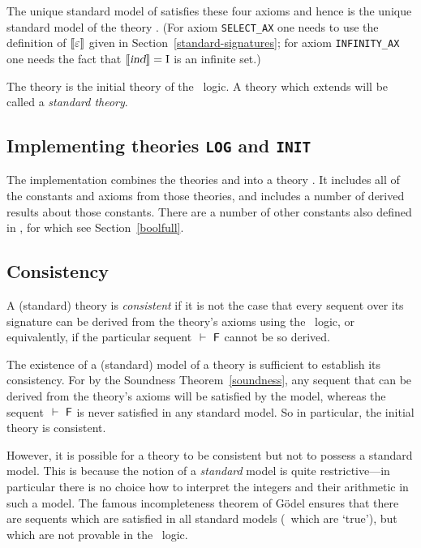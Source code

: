 The unique standard model of  satisfies these four axioms
and hence is the unique standard model of the theory
. (For axiom
{\small\tt SELECT\_AX} one needs to use the definition of
$[\![\varepsilon]\!]$ given in Section~\ref{standard-signatures}; for axiom
{\small\tt INFINITY\_AX} one needs the fact that $[\![\textsl{ind}]\!]=\mbox{\rm I}$ is
an infinite set.)

The theory  is the initial theory of the
\HOL\ logic. A theory which extends  will be called a
{\em standard theory}.

\subsection{Implementing theories \texttt{LOG} and \texttt{INIT}}
\label{sec:implementing-log-init}

The implementation combines the theories  and
 into a theory .  It includes all of the
constants and axioms from those theories, and includes a number of
derived results about those constants.  There are a number of other
constants also defined in , for which see
Section~\ref{boolfull}.

\subsection{Consistency}
\label{consistency}

A (standard) theory is {\em consistent\/} if
it is not the case that every sequent over its signature can be
derived from the theory's axioms using the \HOL\ logic, or
equivalently, if the particular sequent $\ \vdash\ {\sf F}$ cannot be so derived.

The existence of a (standard) model of a theory is sufficient to
establish its consistency. For by the Soundness
Theorem~\ref{soundness}, any sequent that can be derived from the
theory's axioms will be satisfied by the model, whereas the sequent
$\ \vdash\ {\sf F}$ is never satisfied in any standard model.  So in particular,
the initial theory  is consistent.

However, it is possible for a theory to be consistent but not to
possess a standard model. This is because the notion of a {\em
standard\/} model is quite restrictive---in particular there is no
choice how to interpret the integers and their arithmetic in such a
model. The famous incompleteness theorem of G\"odel ensures that there
are sequents which are satisfied in all standard models (\ie\ which are
`true'), but which are not provable in the \HOL\ logic.





